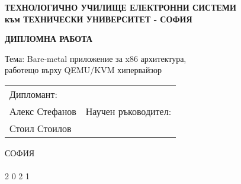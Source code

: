 \thispagestyle{empty} %
\begin{center}
  \textbf{
    ТЕХНОЛОГИЧНО УЧИЛИЩЕ ЕЛЕКТРОННИ СИСТЕМИ \\
    към ТЕХНИЧЕСКИ УНИВЕРСИТЕТ - СОФИЯ \\
  }

  \vspace{70mm}
  \textbf{\huge ДИПЛОМНА РАБОТА \\ }

  \vspace{20mm}
  {\Large Тема:
    Bare-metal приложение за x86 архитектура, \\
    работещо върху QEMU/KVM хипервайзор
  }

  \vspace{35mm}
  \begin{tabular}{p{8cm}p{8cm}}
    \centering
    Дипломант: \\
    Алекс Стефанов
    &
    \centering
    Научен ръководител: \\
    Стоил Стоилов
  \end{tabular}

  \vfill
  СОФИЯ \\
  \hfill \\
  2 0 2 1 \\
\end{center}
\newpage
